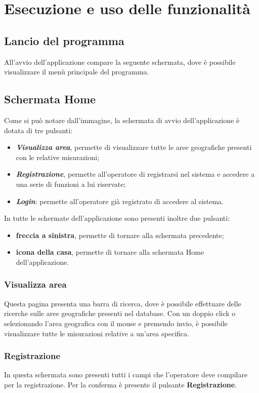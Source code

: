 \chapter{Esecuzione e uso delle funzionalità}
\section{Lancio del programma}
All’avvio dell’applicazione compare la seguente schermata, dove è possibile visualizzare il menù principale del programma.
\section{Schermata Home}
Come si può notare dall'immagine, la schermata di avvio dell'applicazione è dotata di tre pulsanti:
\begin{itemize}
	\item \textbf{\textit{Visualizza area}}, permette di visualizzare tutte le aree geografiche presenti con le relative misurazioni;
	\item \textbf{\textit{Registrazione}}, permette all'operatore di registrarsi nel sistema e accedere a una serie di funzioni a lui riservate;
	\item \textbf{\textit{Login}}: permette all'operatore già registrato di accedere al sistema. 
\end{itemize}
In tutte le schermate dell'applicazione sono presenti inoltre due pulsanti:
\begin{itemize}
	\item \textbf{freccia a sinistra}, permette di tornare alla schermata precedente;
	\item \textbf{icona della casa}, permette di tornare alla schermata Home dell'applicazione.
\end{itemize}
\subsection{Visualizza area}\label{VisualizzaArea}
Questa pagina presenta una barra di ricerca, dove è possibile effettuare delle ricerche sulle aree geografiche presenti nel database.
Con un doppio click o selezionando l'area geografica con il mouse e premendo invio, è possibile visualizzare tutte le misurazioni relative a un'area specifica.

\subsection{Registrazione}
In questa schermata sono presenti tutti i campi che l'operatore deve compilare per la registrazione. Per la conferma è presente il pulsante \textbf{Registrazione}.

